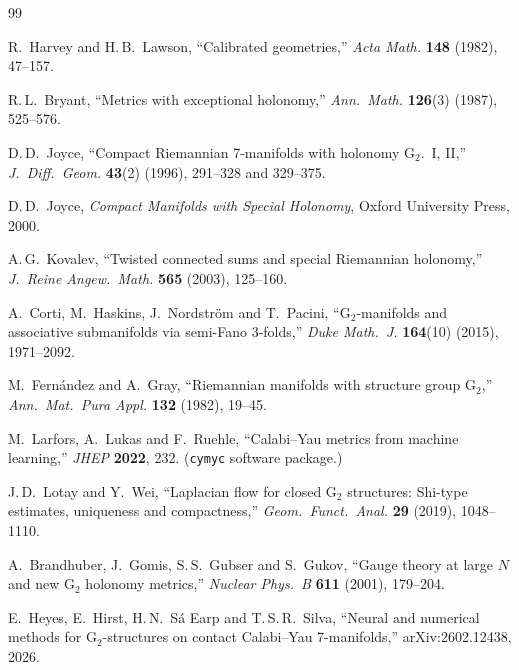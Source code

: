\documentclass[11pt,a4paper]{article}
\theoremstyle{remark}
\begin{document}
\begin{thebibliography}{99}

R.~Harvey and H.\,B.~Lawson,
``Calibrated geometries,''
\textit{Acta Math.} \textbf{148} (1982), 47--157.

R.\,L.~Bryant,
``Metrics with exceptional holonomy,''
\textit{Ann.\ Math.} \textbf{126}(3) (1987), 525--576.

D.\,D.~Joyce,
``Compact Riemannian 7-manifolds with holonomy $\mathrm{G}_2$.\ I, II,''
\textit{J.\ Diff.\ Geom.} \textbf{43}(2) (1996), 291--328 and 329--375.

D.\,D.~Joyce,
\textit{Compact Manifolds with Special Holonomy},
Oxford University Press, 2000.

A.\,G.~Kovalev,
``Twisted connected sums and special Riemannian holonomy,''
\textit{J.\ Reine Angew.\ Math.} \textbf{565} (2003), 125--160.

A.~Corti, M.~Haskins, J.~Nordstr\"om and T.~Pacini,
``$\mathrm{G}_2$-manifolds and associative submanifolds via semi-Fano 3-folds,''
\textit{Duke Math.\ J.} \textbf{164}(10) (2015), 1971--2092.

M.~Fern\'andez and A.~Gray,
``Riemannian manifolds with structure group $\mathrm{G}_2$,''
\textit{Ann.\ Mat.\ Pura Appl.} \textbf{132} (1982), 19--45.

M.~Larfors, A.~Lukas and F.~Ruehle,
``Calabi--Yau metrics from machine learning,''
\textit{JHEP} \textbf{2022}, 232.
(\texttt{cymyc} software package.)

J.\,D.~Lotay and Y.~Wei,
``Laplacian flow for closed $\mathrm{G}_2$ structures:
Shi-type estimates, uniqueness and compactness,''
\textit{Geom.\ Funct.\ Anal.} \textbf{29} (2019), 1048--1110.

A.~Brandhuber, J.~Gomis, S.\,S.~Gubser and S.~Gukov,
``Gauge theory at large $N$ and new $\mathrm{G}_2$ holonomy metrics,''
\textit{Nuclear Phys.\ B} \textbf{611} (2001), 179--204.

E.~Heyes, E.~Hirst, H.\,N.~S\'a Earp and T.\,S.\,R.~Silva,
``Neural and numerical methods for $\mathrm{G}_2$-structures on contact Calabi--Yau 7-manifolds,''
arXiv:2602.12438, 2026.

\end{thebibliography}

\end{document}
